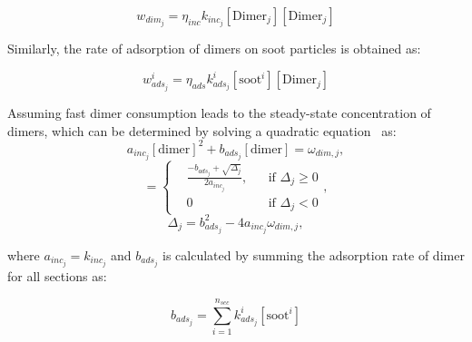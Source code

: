 \begin{equation}
	w_{dim_j} = \eta_{inc} k_{inc_{j}} [\mathrm{Dimer}_j] [\mathrm{Dimer}_j]
	\label{eqn:wdim_dimcoal}
\end{equation}

Similarly, the rate of adsorption of dimers on soot particles is obtained as:

\begin{equation}
	w^i_{ads_j} = \eta_{ads} k^i_{ads_{j}} [\mathrm{soot}^i] [\mathrm{Dimer}_j]
\end{equation}

Assuming fast dimer consumption leads to the steady-state concentration of dimers, which can be determined by solving a quadratic equation~\citep{blanquart2009analyzing} as:
\begin{equation}
	a_{inc_j}[\mathrm{dimer}]^2+b_{ads_j}[\mathrm{dimer}]=\omega_{dim,j},
	\label{eqn:quad_dimcoal}
\end{equation}
\begin{equation}
	[\mathrm{Dimer}_j]=
	\left\{
	\begin{aligned}
		&\frac{-b_{ads_j}+\sqrt{\Delta_j}}{2a_{inc_j}},
		&&
		\text{if } \Delta_j \ge 0
		\\
		& 0 
		&&
		\text{if } \Delta_j < 0
	\end{aligned},
	\right.
	\label{eqn:dimer_dimcoal}
\end{equation}
\begin{equation}
	\Delta_j = b_{ads_j}^2-4a_{inc_j}\omega_{dim,j},
	\label{eqn:delta_dimcoal}
\end{equation}

\noindent where ${a_{inc_j} = k_{inc_{j}}}$ and ${b_{ads_j}}$ is calculated by summing the adsorption rate of dimer for all sections as:

\begin{equation}
	b_{ads_j} = \sum_{i=1}^{n_{sec}} k^i_{ads_{j}} [\mathrm{soot}^i]
\end{equation}

